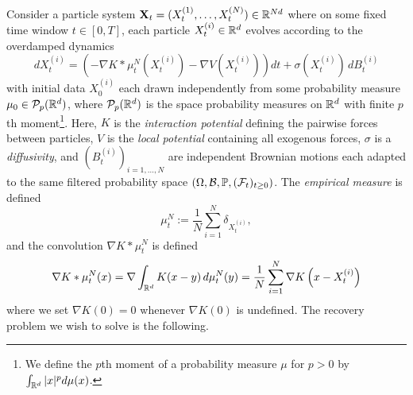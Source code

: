 \documentclass[english,reqno]{amsart}
\begin{document}
Consider a particle system $\mathbf{X}_t = (X^{(1)}_t,\dots,X^{(N)}_t) \in \mathbb{R}^{Nd}$ where on some fixed time window $t\in[0,T]$, each particle $X^{(i)}_t\in \mathbb{R}^d$ evolves according to the overdamped dynamics
\begin{equation}\label{dXt}
dX_t^{(i)} = \left(-\nabla K*\mu^N_t\left(X^{(i)}_t\right)-\nabla V\left(X^{(i)}_t\right) \right) dt + \sigma(X_t^{(i)})\, dB_t^{(i)}
\end{equation}
with initial data $X_0^{(i)}$ each drawn independently from some probability measure $\mu_0\in {\mathcal{P}}_p(\mathbb{R}^d)$, where ${\mathcal{P}}_p(\mathbb{R}^d)$ is the space probability measures on $\mathbb{R}^d$ with finite $p$th moment\footnote{We define the  $p$th moment of a probability measure $\mu$ for $p>0$ by $\int_{\mathbb{R}^d}|x|^pd\mu(x)$.}. Here, $K$ is the {\it interaction potential} defining the pairwise forces between particles, $V$ is the {\it local potential} containing all exogenous forces, $\sigma$ is a {\it diffusivity}, and $\left(B^{(i)}_t\right)_{i=1,\dots,N}$ are independent Brownian motions each adapted to the same filtered probability space $(\Omega, {\mathcal{B}}, \mathbb{P}, ({\mathcal{F}}_t)_{t\geq 0})$.  The {\it empirical measure} is defined
\[\mu^N_t := \frac{1}{N}\sum_{i=1}^N \delta_{X^{(i)}_t},\]
and the convolution $\nabla K* \mu^N_t$ is defined 
\[\nabla K* \mu^N_t(x) = \nabla\int_{\mathbb{R}^d} K(x-y)\,d\mu^N_t(y)=\frac{1}{N}\sum_{i=1}^N \nabla K\left(x-X^{(i)}_t\right)\]
where we set $\nabla K(0) = 0$ whenever $\nabla K(0)$ is undefined. The recovery problem we wish to solve is the following.\\
\end{document}
